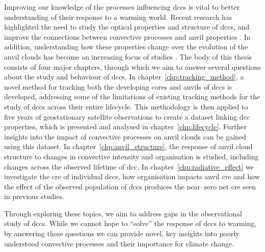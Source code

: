 Improving our knowledge of the processes influencing \acrshort{dcc}s is vital to better understanding of their response to a warming world.
Recent research has highlighted the need to study the optical properties and structure of \acrshort{dcc}s, and improve the connections between convective processes and anvil properties \citep{gasparini_opinion_2023}.
In addition, understanding how these properties change over the evolution of the anvil clouds has become an increasing focus of studies \citep{sokol_tropical_2020, wall_life_2018, bouniol_life_2021}.
The body of this thesis consists of four major chapters, through which we aim to answer several questions about the study and behaviour of \acrshort{dcc}s.
In chapter~\ref{chp:tracking_method}, a novel method for tracking both the developing cores and anvils of \acrshort{dcc}s is developed, addressing some of the limitations of existing tracking methods for the study of \acrshort{dcc}s across their entire lifecycle.
This methodology is then applied to five years of geostationary satellite observations to create a dataset linking \acrshort{dcc} properties, which is presented and analysed in chapter~\ref{chp:lifecycle}.
Further insights into the impact of convective processes on anvil clouds can be gained using this dataset.
In chapter~\ref{chp:anvil_structure}, the response of anvil cloud structure to changes in convective intensity and organisation is studied, including changes across the observed lifetime of \acrshort{dcc}.
In chapter~\ref{chp:radiative_effect} we investigate the \acrshort{cre} of individual \acrshort{dcc}s, how organisation impacts anvil \acrshort{cre} and how the effect of the observed population of \acrshort{dcc}s produces the near--zero net \acrshort{cre} seen in previous studies.

Through exploring these topics, we aim to address gaps in the observational study of \acrshort{dcc}s.
While we cannot hope to ``solve'' the response of \acrshort{dcc}s to warming, by answering these questions we can provide novel, key insights into poorly understood convective processes and their importance for climate change.


